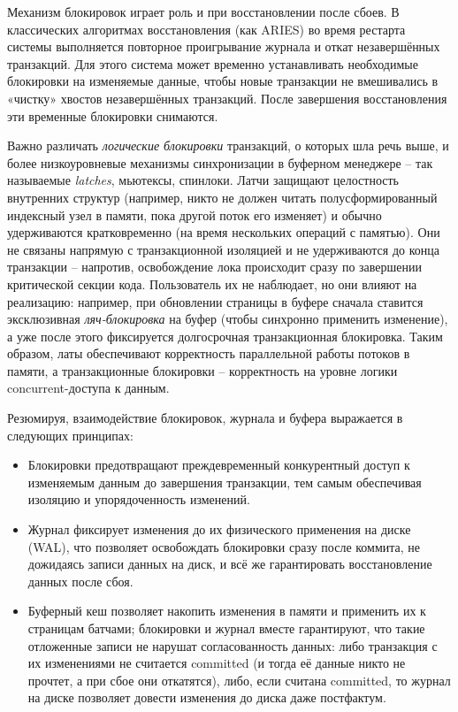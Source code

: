  Механизм блокировок играет роль и при восстановлении после сбоев. В классических алгоритмах восстановления (как ARIES) во время рестарта системы выполняется повторное проигрывание журнала и откат незавершённых транзакций. Для этого система может временно устанавливать необходимые блокировки на изменяемые данные, чтобы новые транзакции не вмешивались в «чистку» хвостов незавершённых транзакций. После завершения восстановления эти временные блокировки снимаются. 

 Важно различать \textit{логические блокировки} транзакций, о которых шла речь выше, и более низкоуровневые механизмы синхронизации в буферном менеджере – так называемые \textit{latches}, мьютексы, спинлоки. Латчи защищают целостность внутренних структур (например, никто не должен читать полусформированный индексный узел в памяти, пока другой поток его изменяет) и обычно удерживаются кратковременно (на время нескольких операций с памятью). Они не связаны напрямую с транзакционной изоляцией и не удерживаются до конца транзакции – напротив, освобождение лока происходит сразу по завершении критической секции кода. Пользователь их не наблюдает, но они влияют на реализацию: например, при обновлении страницы в буфере сначала ставится эксклюзивная \textit{ляч-блокировка} на буфер (чтобы синхронно применить изменение), а уже после этого фиксируется долгосрочная транзакционная блокировка. Таким образом, латы обеспечивают корректность параллельной работы потоков в памяти, а транзакционные блокировки – корректность на уровне логики concurrent-доступа к данным. 

 Резюмируя, взаимодействие блокировок, журнала и буфера выражается в следующих принципах:
 \begin{itemize}
    \item Блокировки предотвращают преждевременный конкурентный доступ к изменяемым данным до завершения транзакции, тем самым обеспечивая изоляцию и упорядоченность изменений.
    \item Журнал фиксирует изменения до их физического применения на диске (WAL), что позволяет освобождать блокировки сразу после коммита, не дожидаясь записи данных на диск, и всё же гарантировать восстановление данных после сбоя.
    \item Буферный кеш позволяет накопить изменения в памяти и применить их к страницам батчами; блокировки и журнал вместе гарантируют, что такие отложенные записи не нарушат согласованность данных: либо транзакция с их изменениями не считается committed (и тогда её данные никто не прочтет, а при сбое они откатятся), либо, если считана committed, то журнал на диске позволяет довести изменения до диска даже постфактум.
 \end{itemize}

